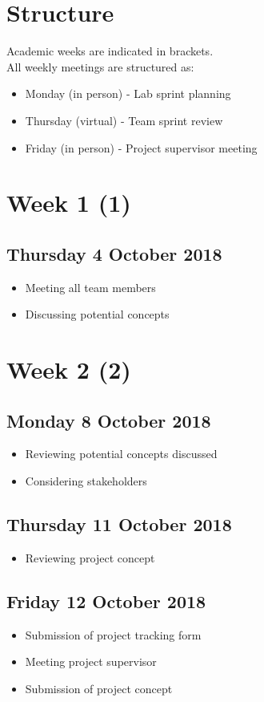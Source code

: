 \section*{Structure}
Academic weeks are indicated in brackets.\\

All weekly meetings are structured as:
\begin{itemize}
	\item Monday (in person) - Lab sprint planning
	\item Thursday (virtual) - Team sprint review
	\item Friday (in person) - Project supervisor meeting
\end{itemize}

\section*{Week 1 (1)}
\subsection*{Thursday 4 October 2018}
\begin{itemize}
	\item Meeting all team members
	\item Discussing potential concepts
\end{itemize}

\section*{Week 2 (2)}
\subsection*{Monday 8 October 2018}
\begin{itemize}
	\item Reviewing potential concepts discussed
    \item Considering stakeholders
\end{itemize}

\subsection*{Thursday 11 October 2018}
\begin{itemize}
	\item Reviewing project concept
\end{itemize}

\subsection*{Friday 12 October 2018}
\begin{itemize}
    \item Submission of project tracking form
	\item Meeting project supervisor
	\item Submission of project concept
\end{itemize}

